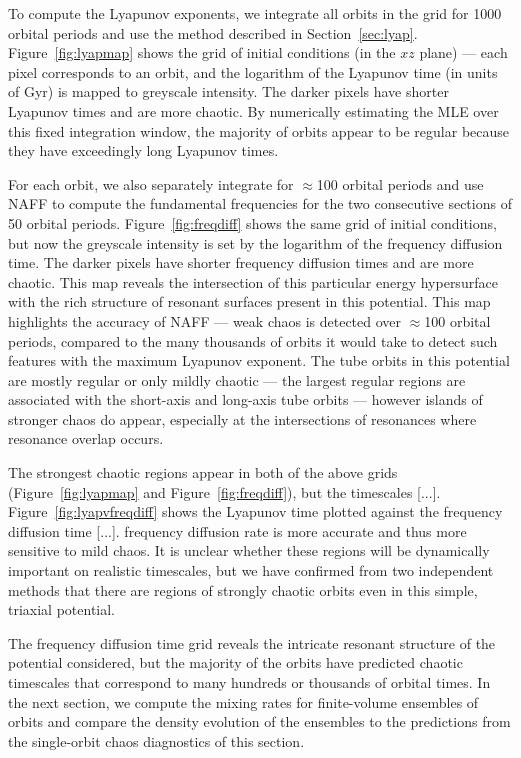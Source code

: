 \documentclass[letterpaper,12pt,preprint]{aastex}
\begin{document}
To compute the Lyapunov exponents, we integrate all orbits in the grid for 1000 orbital periods and use the method described in Section~\ref{sec:lyap}. Figure~\ref{fig:lyapmap} shows the grid of initial conditions (in the $xz$ plane) --- each pixel corresponds to an orbit, and the logarithm of the Lyapunov time (in units of Gyr) is mapped to greyscale intensity. The darker pixels have shorter Lyapunov times and are more chaotic. By numerically estimating the MLE over this fixed integration window, the majority of orbits appear to be regular because they have exceedingly long Lyapunov times. 

For each orbit, we also separately integrate for $\approx$100 orbital periods and use NAFF to compute the fundamental frequencies for the two consecutive sections of 50 orbital periods. Figure~\ref{fig:freqdiff} shows the same grid of initial conditions, but now the greyscale intensity is set by the logarithm of the frequency diffusion time. The darker pixels have shorter frequency diffusion times and are more chaotic. This map reveals the intersection of this particular energy hypersurface with the rich structure of resonant surfaces present in this potential. This map highlights the accuracy of NAFF --- weak chaos is detected over $\approx$100 orbital periods, compared to the many thousands of orbits it would take to detect such features with the maximum Lyapunov exponent. The tube orbits in this potential are mostly regular or only mildly chaotic --- the largest regular regions are associated with the short-axis and long-axis tube orbits --- however islands of stronger chaos do appear, especially at the intersections of resonances where resonance overlap occurs. 

The strongest chaotic regions appear in both of the above grids (Figure~\ref{fig:lyapmap} and Figure~\ref{fig:freqdiff}), but the timescales [...]. Figure~\ref{fig:lyapvfreqdiff} shows the Lyapunov time plotted against the frequency diffusion time [...]. frequency diffusion rate is more accurate and thus more sensitive to mild chaos. It is unclear whether these regions will be dynamically important on realistic timescales, but we have confirmed from two independent methods that there are regions of strongly chaotic orbits even in this simple, triaxial potential.

The frequency diffusion time grid reveals the intricate resonant structure of the potential considered, but the majority of the orbits have predicted chaotic timescales that correspond to many hundreds or thousands of orbital times. In the next section, we compute the mixing rates for finite-volume ensembles of orbits and compare the density evolution of the ensembles to the predictions from the single-orbit chaos diagnostics of this section.
\end{document}
